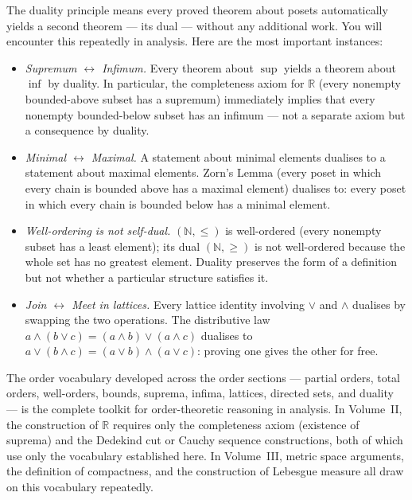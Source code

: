 \begin{remark*}
\label{rem:duality-pairs}
The duality principle means every proved theorem about posets automatically
yields a second theorem — its dual — without any additional work.  You will
encounter this repeatedly in analysis.  Here are the most important instances:
\begin{itemize}
  \item \emph{Supremum $\leftrightarrow$ Infimum.}  Every theorem about
        $\sup$ yields a theorem about $\inf$ by duality.  In particular,
        the completeness axiom for $\mathbb{R}$ (every nonempty bounded-above
        subset has a supremum) immediately implies that every nonempty
        bounded-below subset has an infimum — not a separate axiom but a
        consequence by duality.
  \item \emph{Minimal $\leftrightarrow$ Maximal.}  A statement about minimal
        elements dualises to a statement about maximal elements.  Zorn's Lemma
        (every poset in which every chain is bounded above has a maximal
        element) dualises to: every poset in which every chain is bounded below
        has a minimal element.
  \item \emph{Well-ordering is not self-dual.}
        $(\mathbb{N}, \leq)$ is well-ordered (every nonempty subset has a
        least element); its dual $(\mathbb{N}, \geq)$ is not well-ordered
        because the whole set has no greatest element.  Duality preserves
        the form of a definition but not whether a particular structure
        satisfies it.
  \item \emph{Join $\leftrightarrow$ Meet in lattices.}  Every lattice identity
        involving $\vee$ and $\wedge$ dualises by swapping the two operations.
        The distributive law $a \wedge (b \vee c) = (a \wedge b) \vee
        (a \wedge c)$ dualises to $a \vee (b \wedge c) =
        (a \vee b) \wedge (a \vee c)$: proving one gives the other for free.
\end{itemize}
\end{remark*}

\begin{remark*}[Transition]
\label{rem:hasse-transition}
The order vocabulary developed across the order sections — partial orders,
total orders, well-orders, bounds, suprema, infima, lattices, directed sets,
and duality — is the complete toolkit for order-theoretic reasoning in analysis.
In Volume~II, the construction of $\mathbb{R}$ requires only the completeness
axiom (existence of suprema) and the Dedekind cut or Cauchy sequence
constructions, both of which use only the vocabulary established here.  In
Volume~III, metric space arguments, the definition of compactness, and the
construction of Lebesgue measure all draw on this vocabulary repeatedly.
\end{remark*}
